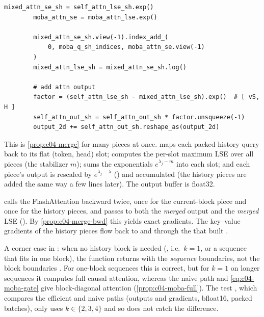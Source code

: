 \begin{implnote}[title={In the code: the efficient path, \texttt{moba\_efficient.py}}]
\begin{lstlisting}[caption={Excerpt from \texttt{repos/\allowbreak{}MoonshotAI\_\_MoBA/\allowbreak{}moba/\allowbreak{}moba\_efficient.py}},label={lst:c04-moba-merge}]
        mixed_attn_se_sh = self_attn_lse_sh.exp()
        moba_attn_se = moba_attn_lse.exp()

        mixed_attn_se_sh.view(-1).index_add_(
            0, moba_q_sh_indices, moba_attn_se.view(-1)
        )
        mixed_attn_lse_sh = mixed_attn_se_sh.log()

        # add attn output
        factor = (self_attn_lse_sh - mixed_attn_lse_sh).exp()  # [ vS, H ]
        self_attn_out_sh = self_attn_out_sh * factor.unsqueeze(-1)
        output_2d += self_attn_out_sh.reshape_as(output_2d)
\end{lstlisting}
This is \cref{prop:c04-merge} for many pieces at once.  maps each packed
history query back to its flat (token, head) slot;  computes the
per-slot maximum LSE over all pieces (the stabilizer $m$);  sums the
exponentials $e^{\lambda_j-m}$ into each slot; and each piece's output is rescaled by
$e^{\lambda_j-\lambda}$ () and accumulated (the history pieces are added the same
way a few lines later). The output buffer is float32.

 calls the FlashAttention backward twice, once for the
current-block piece and once for the history pieces, and passes to both the \emph{merged} output
and the \emph{merged} LSE (). By \cref{prop:c04-merge-bwd} this yields
exact gradients. The key--value gradients of the history pieces flow back to  and
 through the  that built .
\end{implnote}

\begin{pitfall}
A corner case in : when no history block is needed
(, i.e.\ $k=1$, or a sequence that fits in one block), the function
returns  with the
\emph{sequence} boundaries, not the block boundaries . For one-block sequences
this is correct, but for $k=1$ on longer sequences it computes full causal attention, whereas the
naive path and \eqref{eq:c04-moba-gate} give block-diagonal attention (\cref{prop:c04-moba-full}).
The test , which compares the efficient
and naive paths (outputs and gradients, bfloat16, packed batches), only uses $k\in\{2,3,4\}$ and so
does not catch the difference.
\end{pitfall}

